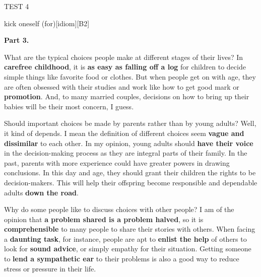 \begin{glossarymc}[Cambridge 6]
\begin{test}{TEST 4}
\begin{VocabExplain}[Part 2]
            \begin{ExplainCard}{kick oneself (for)}[idiom][B2]
            \end{ExplainCard}
        \end{VocabExplain}

    \noindent
    \textbf{Part 3.}
    \begin{qa}{What are the typical choices people make at different stages of their lives?}
    In \textbf{carefree childhood}, it is \textbf{as easy as falling off a log} for children to decide simple things like favorite food or clothes. But when people get on with age, they are often obsessed with their studies and work like how to get good mark or \textbf{promotion}. And, to many married couples, decisions on how to bring up their babies will be their most concern, I guess.
    \end{qa}

    \begin{qa}{Should important choices be made by parents rather than by young adults?}
    Well, it kind of depends. I mean the definition of different choices seem \textbf{vague and dissimilar} to each other. In my opinion, young adults should \textbf{have their voice} in the decision-making process as they are integral parts of their family. In the past, parents with more experience could have greater powers in drawing conclusions. In this day and age, they should grant their children the rights to be decision-makers. This will help their offspring become responsible and dependable adults \textbf{down the road}.
    \end{qa}

    \begin{qa}{Why do some people like to discuss choices with other people?}
    I am of the opinion that \textbf{a problem shared is a problem halved}, so it is \textbf{comprehensible} to many people to share their stories with others. When facing a \textbf{daunting task}, for instance, people are apt to \textbf{enlist the help} of others to look for \textbf{sound advice}, or simply empathy for their situation. Getting someone to \textbf{lend a sympathetic ear} to their problems is also a good way to reduce stress or pressure in their life.
    \end{qa}


\end{test}
\end{glossarymc}
